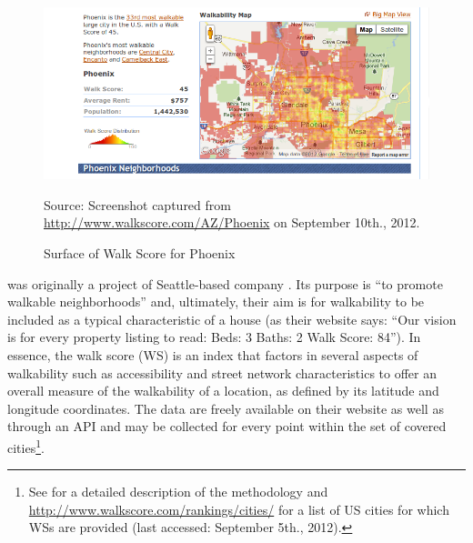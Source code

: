 \documentclass[12pt]{article}
\begin{document}
\begin{figure}[<+t+>]
   \begin{center}
       \includegraphics[width=1.0\textwidth]{walkscore.png}
   \end{center}
   \begin{footnotesize}
       Source: Screenshot captured from
       \url{http://www.walkscore.com/AZ/Phoenix} on September 10th., 2012.
   \end{footnotesize}
   \caption{Surface of Walk Score for Phoenix}
   \label{fig:livehood}
\end{figure}

\cite{walkscore} was originally a project of Seattle-based company
\cite{frontseat}. Its purpose is ``to promote walkable neighborhoods'' and,
ultimately, their aim is for walkability to be included as a typical
characteristic of a house (as their website says: ``Our vision is for every
property listing to read: Beds: 3 Baths: 2 Walk Score: 84''). In essence, the
walk score (WS) is an index that factors in several aspects of walkability
such as accessibility and street network characteristics to offer an overall
measure of the walkability of a location, as defined by its latitude and
longitude coordinates. The data are freely available on their website as well
as through an API and may be collected for every point within the set of
covered cities\footnote{See \cite{walkscoreWhite} for a detailed
description of the methodology and
\url{http://www.walkscore.com/rankings/cities/} for a list of US cities for
which WSs are provided (last accessed: September 5th., 2012).}.
\end{document}
